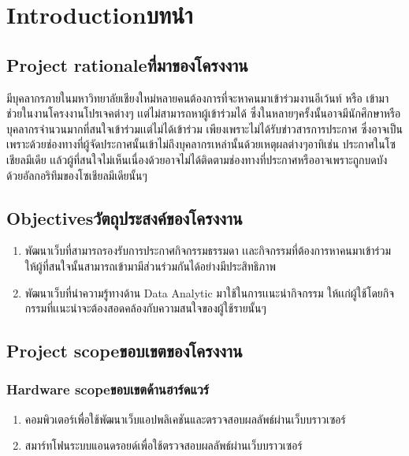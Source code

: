 \chapter{\ifenglish Introduction\else บทนำ\fi}

\section{\ifenglish Project rationale\else ที่มาของโครงงาน\fi}
มีบุคลากรภายในมหาวิทยาลัยเชียงใหม่หลายคนต้องการที่จะหาคนมาเข้าร่วมงานอีเว้นท์ หรือ เข้ามาช่วยในงานโครงงานโปรเจคต่างๆ เเต่ไม่สามารถหาผู้เข้าร่วมได้ ซึ่งในหลายๆครั้งนั้นอาจมีนักศึกษาหรือบุคลากรจำนวนมากที่สนใจเข้าร่วมเเต่ไม่ได้เข้าร่วม เพียงเพราะไม่ได้รับข่าวสารการประกาศ ซึ่งอาจเป็นเพราะด้วยช่องทางที่ผู้จัดประกาศนั้นเข้าไม่ถึงบุคลากรเหล่านั้นด้วยเหตุผลต่างๆอาทิเช่น ประกาศในโซเชียลมีเดีย เเล้วผู้ที่สนใจไม่เห็นเนื่องด้วยอาจไม่ได้ติดตามช่องทางที่ประกาศหรืออาจเพราะถูกบดบังด้วยอัลกอริทึมของโซเชียลมีเดียนั้นๆ


\section{\ifenglish Objectives\else วัตถุประสงค์ของโครงงาน\fi}
\begin{enumerate}
    \item พัฒนาเว็บที่สามารถรองรับการประกาศกิจกรรมธรรมดา เเละกิจกรรมที่ต้องการหาคนมาเข้าร่วม ให้ผู้ที่สนใจนั้นสามารถเข้ามามีส่วนร่วมกันได้อย่างมีประสิทธิภาพ
    \item พัฒนาเว็บที่นำความรู้ทางด้าน Data Analytic มาใช้ในการเเนะนำกิจกรรม ให้เเก่ผู้ใช้โดยกิจกรรมที่เเนะนำจะต้องสอดคล้องกับความสนใจของผู้ใช้รายนั้นๆ
\end{enumerate}

\section{\ifenglish Project scope\else ขอบเขตของโครงงาน\fi}

\subsection{\ifenglish Hardware scope\else ขอบเขตด้านฮาร์ดแวร์\fi}
\begin{enumerate}
    \item คอมพิวเตอร์เพื่อใช้พัฒนาเว็บแอปพลิเคชันและตรวจสอบผลลัพธ์ผ่านเว็บบราวเซอร์
    \item สมาร์ทโฟนระบบแอนดรอยด์เพื่อใช้ตรวจสอบผลลัพธ์ผ่านเว็บบราวเซอร์
\end{enumerate}

